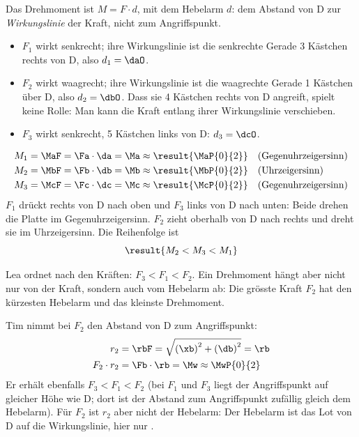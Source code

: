 \begin{abcliste}
\abc
Das Drehmoment ist $M = F\cdot d$, mit dem Hebelarm $d$: dem Abstand von D zur \emph{Wirkungslinie} der Kraft, nicht zum Angriffspunkt.
\begin{itemize}
 \item $F_1$ wirkt senkrecht; ihre Wirkungslinie ist die senkrechte Gerade 3 Kästchen rechts von D, also $d_1 = \daO$.
 \item $F_2$ wirkt waagrecht; ihre Wirkungslinie ist die waagrechte Gerade 1 Kästchen über D, also $d_2 = \dbO$. Dass sie 4 Kästchen rechts von D angreift, spielt keine Rolle: Man kann die Kraft entlang ihrer Wirkungslinie verschieben.
 \item $F_3$ wirkt senkrecht, 5 Kästchen links von D: $d_3 = \dcO$.
\end{itemize}
\begin{align}
 M_1 &= \MaF = \Fa\cdot\da = \Ma \approx \result{\MaP{0}{2}} \quad\text{(Gegenuhrzeigersinn)}\\
 M_2 &= \MbF = \Fb\cdot\db = \Mb \approx \result{\MbP{0}{2}} \quad\text{(Uhrzeigersinn)}\\
 M_3 &= \McF = \Fc\cdot\dc = \Mc \approx \result{\McP{0}{2}} \quad\text{(Gegenuhrzeigersinn)}
\end{align}
$F_1$ drückt rechts von D nach oben und $F_3$ links von D nach unten: Beide drehen die Platte im Gegenuhrzeigersinn. $F_2$ zieht oberhalb von D nach rechts und dreht sie im Uhrzeigersinn. Die Reihenfolge ist
\[
 \result{M_2 < M_3 < M_1}
\]

\abc
Lea ordnet nach den Kräften: $F_3 < F_1 < F_2$. Ein Drehmoment hängt aber nicht nur von der Kraft, sondern auch vom Hebelarm ab: Die grösste Kraft $F_2$ hat den kürzesten Hebelarm und das kleinste Drehmoment.

Tim nimmt bei $F_2$ den Abstand von D zum Angriffspunkt:
\begin{align}
 r_2 &= \rbF = \sqrt{\left(\xb\right)^2+\left(\db\right)^2} = \rb \\
 F_2\cdot r_2 &= \Fb\cdot\rb = \Mw \approx \MwP{0}{2}
\end{align}
Er erhält ebenfalls $F_3 < F_1 < F_2$ (bei $F_1$ und $F_3$ liegt der Angriffspunkt auf gleicher Höhe wie D; dort ist der Abstand zum Angriffspunkt zufällig gleich dem Hebelarm). Für $F_2$ ist $r_2$ aber nicht der Hebelarm: Der Hebelarm ist das Lot von D auf die Wirkungslinie, hier nur \dbO.
\end{abcliste}
